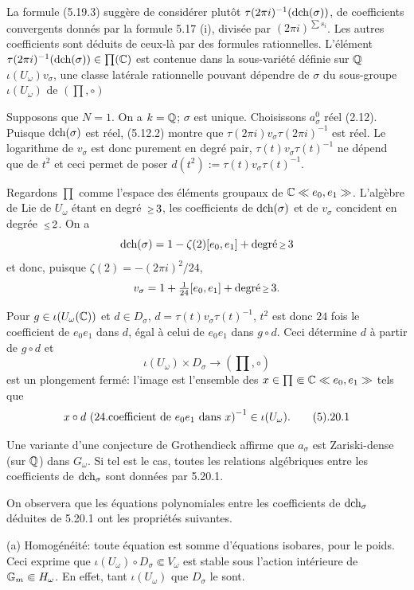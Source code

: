 La formule (5.19.3) sugg\`ere de consid\'erer
plut\^{o}t $\tau(2\pi i)^{-1}(\text{\rm dch}(\sigma))$,
de coefficients convergents donn\'es par la
formule 5.17 (i), divis\'ee par $(2\pi
i)^{\sum s_i}$.
Les autres coefficients sont d\'eduits de
ceux-l\`a par des formules rationnelles.
L'\'el\'ement $\tau(2\pi
i)^{-1}(\text{\rm dch}(\sigma))\in\prod({\Bbb C})$ est
contenue dans la sous-vari\'et\'e d\'efinie
sur ${\Bbb Q}$ $\iota(U_\omega)v_\sigma$, une
classe lat\'erale rationnelle pouvant
d\'ependre de $\sigma$ du sous-groupe
$\iota(U_\omega)$ de $\left(\prod, \circ \right)$

\endsubhead
Supposons que $N=1$.
On a $k={\Bbb Q}$; $\sigma$ est unique.
Choisissons $a_\sigma^0$ r\'eel (2.12).
Puisque $\text{\rm dch}(\sigma)$ est r\'eel, (5.12.2)
montre que $\tau(2\pi i)v_\sigma\tau(2\pi
i)^{-1}$ est r\'eel.
Le logarithme de $v_\sigma$ est donc purement
en degr\'e pair, $\tau(t)v_\sigma\tau(t)^{-1}$
ne d\'epend que de $t^2$ et ceci permet de
poser $d(t^2):=\tau(t)v_\sigma\tau(t)^{-1}$.

Regardons $\prod$ comme l'espace des
\'el\'ements groupaux de ${\Bbb C}\ll e_0,e_1\gg$.
L'alg\`ebre de Lie de $U_\omega$ \'etant en
degr\'e $\Ge 3$, les coefficients de
$\text{\rm dch}(\sigma)$ et de $v_\sigma$
co{\umi}ncident en degr\'ee $\Le 2$.
On a 
$$
\dch(\sigma)=1-\zeta(2)[e_0,e_1]+\text{degr\'e}\Ge 3
$$
et donc, puisque $\zeta(2)=-(2\pi i)^2/24$,
$$
v_\sigma=1+\tfrac{1}{24}[e_0,e_1]+\text{degr\'e}\Ge 3.
$$

Pour $g\in\iota(U_\omega({\Bbb C}))$ et $d\in
D_\sigma$, $d=\tau(t)v_\sigma\tau(t)^{-1}$,
$t^2$ est donc $24$ fois le coefficient de
$e_0e_1$ dans $d$, \'egal \`a celui de $e_0e_1$
dans $g\circ d$.
Ceci d\'etermine $d$ \`a partir de $g\circ d$
et
$$
\iota(U_\omega)\times D_\sigma\to
\left(\prod, \circ \right)
$$
est un plongement ferm\'e: l'image est
l'ensemble des $x\in\prod\Subset{\Bbb C}\ll
e_0,e_1\gg$ tels que
$$
x\circ d\text{ (24.coefficient de $e_0e_1$
dans $x$)}^{-1}\in\iota(U_\omega).
\tag5.20.1
$$

Une variante d'une conjecture de Grothendieck
affirme que $a_\sigma$ est Zariski-dense (sur
${\Bbb Q}$) dans $G_\omega$.
Si tel est le cas, toutes les relations
alg\'ebriques entre les coefficients de
$\text{\rm dch}_\sigma$ sont donn\'ees par 5.20.1.

On observera que les \'equations polynomiales
entre les coefficients de $\text{\rm dch}_\sigma$
d\'eduites de 5.20.1 ont les propri\'et\'es
suivantes.

\medskip\noindent
{\sans (a)}\enspace
Homog\'en\'eit\'e: toute \'equation est somme
d'\'equations isobares, pour le poids.
Ceci exprime que $\iota(U_\omega)\circ
D_\sigma\Subset V_\omega$ est stable sous
l'action int\'erieure de ${\Bbb G}_m\Subset
H_\omega$.
En effet, tant $\iota(U_\omega)$ que
$D_\sigma$ le sont.

